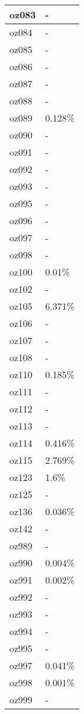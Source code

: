 \documentclass{article}%
\begin{document}
\begin{longtabu}{X[l] X[r]}
\hline%
oz083&{-}\\%
\hline%
oz084&{-}\\%
\hline%
oz085&{-}\\%
\hline%
oz086&{-}\\%
\hline%
oz087&{-}\\%
\hline%
oz088&{-}\\%
\hline%
oz089&0.128\%\\%
\hline%
oz090&{-}\\%
\hline%
oz091&{-}\\%
\hline%
oz092&{-}\\%
\hline%
oz093&{-}\\%
\hline%
oz095&{-}\\%
\hline%
oz096&{-}\\%
\hline%
oz097&{-}\\%
\hline%
oz098&{-}\\%
\hline%
oz100&0.01\%\\%
\hline%
oz102&{-}\\%
\hline%
oz105&6.371\%\\%
\hline%
oz106&{-}\\%
\hline%
oz107&{-}\\%
\hline%
oz108&{-}\\%
\hline%
oz110&0.185\%\\%
\hline%
oz111&{-}\\%
\hline%
oz112&{-}\\%
\hline%
oz113&{-}\\%
\hline%
oz114&0.416\%\\%
\hline%
oz115&2.769\%\\%
\hline%
oz123&1.6\%\\%
\hline%
oz125&{-}\\%
\hline%
oz136&0.036\%\\%
\hline%
oz142&{-}\\%
\hline%
oz989&{-}\\%
\hline%
oz990&0.004\%\\%
\hline%
oz991&0.002\%\\%
\hline%
oz992&{-}\\%
\hline%
oz993&{-}\\%
\hline%
oz994&{-}\\%
\hline%
oz995&{-}\\%
\hline%
oz997&0.041\%\\%
\hline%
oz998&0.001\%\\%
\hline%
oz999&{-}\\%
\hline%
\end{longtabu}%
\end{document}
